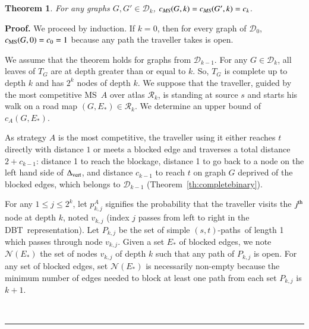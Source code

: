 \documentclass[preprint]{elsarticle}
\newtheorem{theorem}{Theorem}
\newenvironment{proof}[1][Proof]{\textbf{#1.} }{\ \rule{0.5em}{0.5em}}
\newcommand{\ith}[1]{#1^{\mbox{\scriptsize{th}}}}
\newcommand{\stpaths}{$(s,t)$-paths}
\newcommand{\mcalr}{\mathcal{R}}
\newcommand{\mcald}{\mathcal{D}}
\newcommand{\mcaln}{\mathcal{N}}
\newcommand{\mts}{MS}
\newcommand{\deltavert}{\Delta_{\mbox{\scriptsize{vert}}}}
\newcommand{\cms}{c_{\mbox{\scriptsize{MS}}}}
\newcommand{\ebt}{DBT}
\begin{document}
\begin{theorem}
For any graphs $G, G' \in \mcald_k$, $c_{\emph{\scriptsize{MS}}}(G,k) = c_{\emph{\scriptsize{MS}}}(G',k) = c_k$.
\label{th:equalcompetitive}
\end{theorem}
\begin{proof}
We proceed by induction. If $k = 0$, then for every graph of $\mcald_0$, $\cms(G,0) = c_0 = 1$ because any path the traveller takes is open.

We assume that the theorem holds for graphs from $\mcald_{k-1}$. For any $G \in \mcald_k$, all leaves of $T_G$ are at depth greater than or equal to $k$. So, $T_G$ is complete up to depth $k$ and has $2^k$ nodes of depth $k$. We suppose that the traveller, guided by the most competitive \mts ~$A$ over atlas $\mcalr_k$, is standing at source $s$ and starts his walk on a road map $\left(G,E_*\right) \in \mcalr_k$. We determine an upper bound of $c_A(G, E_*)$.

As strategy $A$ is the most competitive, the traveller using it either reaches $t$ directly with distance $1$ or meets a blocked edge and traverses a total distance $2 + c_{k-1}$: distance 1 to reach the blockage, distance 1 to go back to a node on the left hand side of $\deltavert$, and distance $c_{k-1}$ to reach $t$ on graph $G$ deprived of the blocked edges, which belongs to $\mcald_{k-1}$ (Theorem~\ref{th:completebinary}).

For any $1 \le j \le 2^k$, let $p_{k,j}^A$ signifies the probability that the traveller visits the $\ith{j}$ node at depth $k$, noted $v_{k,j}$ (index $j$ passes from left to right in the \ebt ~representation). 
Let $P_{k,j}$ be the set of simple \stpaths ~of length 1 which passes through node $v_{k,j}$.
Given a set $E_*$ of blocked edges, we note $\mcaln(E_*)$ the set of nodes $v_{k,j}$ of depth $k$ such that any path of $P_{k,j}$ is open. For any set of blocked edges, set $\mcaln(E_*)$ is necessarily non-empty because the minimum number of edges needed to block at least one path from each set $P_{k,j}$ is $k+1$. 


\end{proof}
\end{document}
